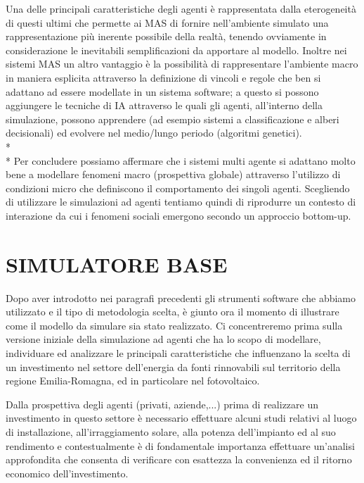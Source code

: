 \documentclass[12pt,a4paper,openright,twoside]{report}
\begin{document}
Una delle principali caratteristiche degli agenti è rappresentata dalla eterogeneità di questi ultimi che permette ai MAS di fornire nell'ambiente simulato una rappresentazione più inerente possibile della realtà, tenendo ovviamente in considerazione le inevitabili semplificazioni da apportare al modello. Inoltre nei sistemi MAS un altro vantaggio è la possibilità di rappresentare l'ambiente macro in maniera esplicita attraverso la definizione di vincoli e regole che ben si adattano ad essere modellate in un sistema software; a questo si possono aggiungere le tecniche di IA attraverso le quali gli agenti, all'interno della simulazione, possono apprendere (ad esempio sistemi a classificazione e alberi decisionali) ed evolvere nel medio/lungo periodo (algoritmi genetici).\\*\\*
Per concludere possiamo affermare che i sistemi multi agente si adattano molto bene a modellare fenomeni macro (prospettiva globale) attraverso l'utilizzo di condizioni micro che definiscono il comportamento dei singoli agenti. Scegliendo di utilizzare le simulazioni ad agenti tentiamo quindi di riprodurre un contesto di interazione da cui i fenomeni sociali emergono secondo un approccio bottom-up.


\section{SIMULATORE BASE}


Dopo aver introdotto nei paragrafi precedenti gli strumenti software che abbiamo utilizzato e il tipo di metodologia scelta, è giunto ora il momento di illustrare come il modello da simulare sia stato realizzato. Ci concentreremo prima sulla versione iniziale della simulazione ad agenti che ha lo scopo di modellare, individuare ed analizzare le principali caratteristiche che influenzano la scelta di un investimento nel settore dell'energia da fonti rinnovabili sul territorio della regione Emilia-Romagna, ed in particolare nel fotovoltaico.

Dalla prospettiva degli agenti (privati, aziende,...) prima di realizzare un investimento in questo settore è necessario effettuare alcuni studi relativi al luogo di installazione, all'irraggiamento solare, alla potenza dell'impianto ed al suo rendimento e contestualmente è di fondamentale importanza effettuare un'analisi approfondita che consenta di verificare con esattezza la convenienza ed il ritorno economico dell'investimento.
\end{document}

